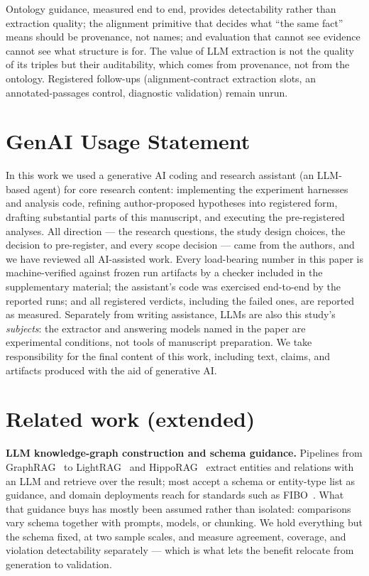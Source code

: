 \documentclass{article}
\begin{document}
Ontology guidance, measured end to end, provides detectability rather
than extraction quality; the alignment primitive that decides what ``the
same fact'' means should be provenance, not names; and evaluation that
cannot see evidence cannot see what structure is for. The value of LLM extraction is not the quality of its triples but their
auditability, which comes from provenance, not from the ontology.
Registered follow-ups (alignment-contract extraction slots, an
annotated-passages control, diagnostic validation) remain unrun.




\appendix
\section*{GenAI Usage Statement}

In this work we used a generative AI coding and research assistant (an
LLM-based agent) for core research content: implementing the experiment
harnesses and analysis code, refining author-proposed hypotheses into
registered form, drafting substantial parts of this manuscript, and
executing the pre-registered analyses. All direction --- the research
questions, the study design choices, the decision to pre-register, and
every scope decision --- came from the authors, and we have reviewed all
AI-assisted work. Every load-bearing number in this paper is
machine-verified against frozen run artifacts by a checker included in the
supplementary material; the assistant's code was exercised end-to-end by
the reported runs; and all registered verdicts, including the failed ones,
are reported as measured. Separately from writing assistance, LLMs are
also this study's \emph{subjects}: the extractor and answering models
named in the paper are experimental conditions, not tools of manuscript
preparation. We take responsibility for the final content of this work,
including text, claims, and artifacts produced with the aid of generative
AI.

\section{Related work (extended)}\label{app:related}

\textbf{LLM knowledge-graph construction and schema guidance.} Pipelines
from GraphRAG~\citep{graphrag} to LightRAG~\citep{lightrag} and
HippoRAG~\citep{hipporag} extract entities and relations with an LLM and
retrieve over the result; most accept a schema or entity-type list as
guidance, and domain deployments reach for standards such as
FIBO~\citep{fibo}. What that guidance buys has mostly been assumed rather
than isolated: comparisons vary schema together with prompts, models, or
chunking. We hold everything but the schema fixed, at two sample scales,
and measure agreement, coverage, and violation detectability separately ---
which is what lets the benefit relocate from generation to validation.
\end{document}
